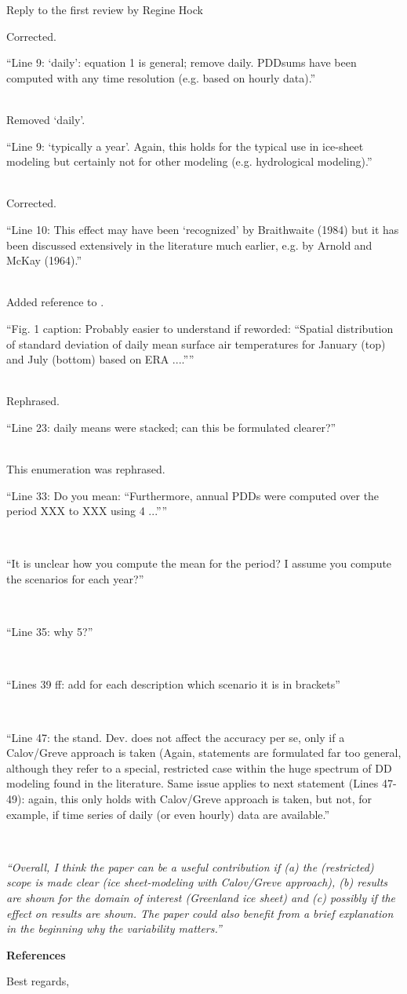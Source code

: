 \documentclass{letter}
\newcommand{\rev}[0]{\color{blue!50!black}\it}
\newcommand{\textrev}[1]{{\rev``#1''}}
\newcommand{\revpoint}[1]{{\rev\item``#1''}\\}
\begin{document}
\begin{letter}{Reply to the first review by Regine Hock}
\begin{enumerate}[resume]
    Corrected.

    \revpoint{Line 9: ‘daily’: equation 1 is general; remove daily. PDDsums have been computed with any time resolution (e.g. based on hourly data).}

    Removed `daily'.

    \revpoint{Line 9: ‘typically a year’. Again, this holds for the typical use in ice-sheet modeling but certainly not for other modeling (e.g. hydrological modeling).}

    Corrected.

    \revpoint{Line 10: This effect may have been ‘recognized’ by Braithwaite (1984) but it has been discussed extensively in the literature much earlier, e.g. by Arnold and McKay (1964).}

    Added reference to \citet{arnold-mckay-1964}.

    \revpoint{Fig. 1 caption: Probably easier to understand if reworded: “Spatial distribution of standard deviation of daily mean surface air temperatures for January (top) and July (bottom) based on ERA ....”}

    Rephrased.

    \revpoint{Line 23: daily means were stacked; can this be formulated clearer?}

    This enumeration was rephrased.

    \revpoint{Line 33: Do you mean: “Furthermore, annual PDDs were computed over the period XXX to XXX using 4 ...”}

    \revpoint{It is unclear how you compute the mean for the period? I assume you compute the scenarios for each year?}

    \revpoint{Line 35: why 5?}

    \revpoint{Lines 39 ff: add for each description which scenario it is in brackets}

    \revpoint{Line 47: the stand. Dev. does not affect the accuracy per se, only if a Calov/Greve approach is taken (Again, statements are formulated far too general, although they refer to a special, restricted case within the huge spectrum of DD modeling found in the literature. Same issue applies to next statement (Lines 47- 49): again, this only holds with Calov/Greve approach is taken, but not, for example, if time series of daily (or even hourly) data are available.}

\end{enumerate}


\textrev{Overall, I think the paper can be a useful contribution if (a) the (restricted) scope is made clear (ice sheet-modeling with Calov/Greve approach), (b) results are shown for the domain of interest (Greenland ice sheet) and (c) possibly if the effect on results are shown. The paper could also benefit from a brief explanation in the beginning why the variability matters.}

\textbf{References}



\closing{Best regards,}

\end{letter}
\end{document}
